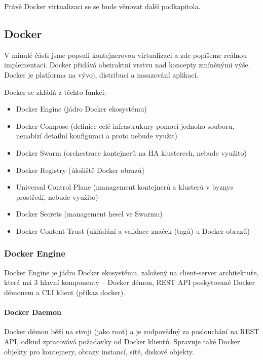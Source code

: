 \documentclass[thesis=M,czech]{FITthesis}[2019/12/23]
\theoremstyle{plain}
\theoremstyle{definition}
\begin{document}
 Právě Docker virtualizaci se se bude věnovat další podkapitola.

\subsection{Docker}

V minulé části jsme popsali kontejnerovou virtualizaci a zde popíšeme reálnou implementaci. Docker přidává abstraktní vrstvu nad koncepty zmíněnými výše. Docker je platforma na vývoj, distribuci a nasazování aplikací. 

Docker se zkládá z těchto funkcí:


\begin{itemize}  
\item Docker Engine (jádro Docker ekosystému)
\item Docker Compose (definice celé infrastrukury pomocí jednoho souboru, nenabízí detailní konfiguraci a proto nebude využit)
\item Docker Swarm (orchestrace kontejnerů na HA klusterech, nebude využito)
\item Docker Registry (úložiště Docker obrazů)
\item Universal Control Plane (management kontejnerů a klusterů v byznys prostředí, nebude využito)
\item Docker Secrets (management hesel ve Swarmu)
\item Docker Content Trust (ukládání a validace značek (tagů) u Docker obrazů)

\end{itemize}


\subsubsection{Docker Engine}

Docker Engine je jádro Docker ekosystému, založený na client-server architektuře, která má 3 hlavní komponenty -- Docker démon, REST API poskytované Docker démonem a CLI klient (příkaz docker).




\paragraph{Docker Daemon}

Docker démon běží na stroji (jako root) a je zodpovědný za poslouchání na REST API, odkud zpracovává požadavky od Docker klientů. Spravuje také Docker objekty pro kontejnery, obrazy instancí, sítě, diskové objekty.
\end{document}

